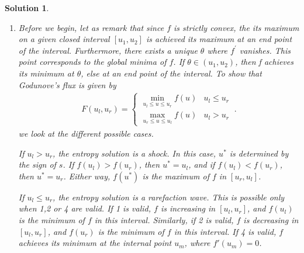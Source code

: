 \documentclass[10pt,letterpaper]{article}
\newcommand{\frb}[1]{ \left(  {#1} \right) }
\theoremstyle{break}
\newtheorem{solution}{Solution}
\begin{document}
\begin{solution}
\begin{enumerate}
        Next suppose $f'(u_l), f'(u_r)\le 0$.
        By similar arguments we get $u^*=u_r$.

        If $f'(u_l) \ge 0\ge f'(u_r)$, the entropy solution is a shock, and the intermediate state $u^*$ is determined by the sign of the shock speed \eqref{RHJumpCond}.

        Finally suppose $f'(u_l) < 0 < f'(u_r)$.
        Then, the entropy solution is a rarefaction wave.
        This time $x=0$ falls inside the rarefaction fan.
        As we have seen in a previous exercise (see exercise set 3), the rarefaction solution is given by $u(x,t)=w\frb{x/t}$, where $w$ is the solution to $f'\frb{w\frb{\xi}}=\xi$.
        Since we are interested in the value of $u$ at $x=0$, we have $u^*=w\frb{0}$.

        \item
        Before we begin, let as remark that since $f$ is strictly convex, the its maximum on a given closed interval $[u_1,u_2]$ is achieved its maximum at an end point of the interval. Furthermore, there exists a unique $\theta$ where $f^\prime$ vanishes. This point corresponds to the global minima of $f$. If $\theta \in (u_1,u_2)$, then f achieves its minimum at $\theta$, else at an end point of the interval.
        To show that Godunove's flux is given by
        \begin{gather} \label{GodFlx}
            F(u_l,u_r)=\begin{cases}
                    \displaystyle
                    \min_{u_l\le u\le u_r} f(u) & u_l\le u_r \\[1em]
                    \displaystyle
                    \max_{u_r\le u\le u_l} f(u) & u_l> u_r 
                \end{cases}\ .
        \end{gather}
        we look at the different possible cases.

        If $u_l>u_r$, the entropy solution is a shock.
        In this case, $u^*$ is determined by the sign of $s$.
        If $f(u_l)>f(u_r)$, then $u^*=u_l$, and if $f(u_l)<f(u_r)$, then $u^*=u_r$.
        Either way, $f\frb{u^*}$ is the maximum of $f$ in $[u_r,u_l]$.

        If $u_l\le u_r$, the entropy solution is a rarefaction wave.
        This is possible only when 1,2 or 4 are valid.
        If 1 is valid, $f$ is increasing in $[u_l,u_r]$, and $f(u_l)$ is the minimum of $f$ in this interval.
        Similarly, if 2 is valid, $f$ is decreasing in $[u_l,u_r]$, and $f(u_r)$ is the minimum of $f$ in this interval.
        If 4 is valid, $f$ achieves its minimum at the internal point $u_m$, where $f'\frb{u_m}=0$.



\end{enumerate}
\end{solution}
\end{document}
